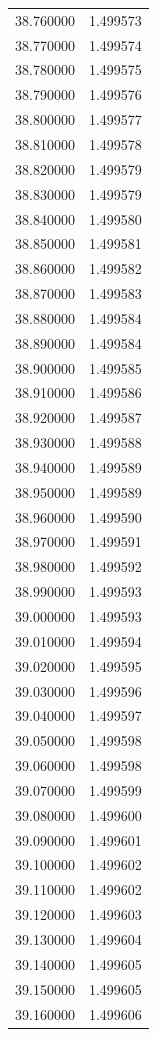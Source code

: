\begin{tabular}{rr}
38.760000 & 1.499573 \\
38.770000 & 1.499574 \\
38.780000 & 1.499575 \\
38.790000 & 1.499576 \\
38.800000 & 1.499577 \\
38.810000 & 1.499578 \\
38.820000 & 1.499579 \\
38.830000 & 1.499579 \\
38.840000 & 1.499580 \\
38.850000 & 1.499581 \\
38.860000 & 1.499582 \\
38.870000 & 1.499583 \\
38.880000 & 1.499584 \\
38.890000 & 1.499584 \\
38.900000 & 1.499585 \\
38.910000 & 1.499586 \\
38.920000 & 1.499587 \\
38.930000 & 1.499588 \\
38.940000 & 1.499589 \\
38.950000 & 1.499589 \\
38.960000 & 1.499590 \\
38.970000 & 1.499591 \\
38.980000 & 1.499592 \\
38.990000 & 1.499593 \\
39.000000 & 1.499593 \\
39.010000 & 1.499594 \\
39.020000 & 1.499595 \\
39.030000 & 1.499596 \\
39.040000 & 1.499597 \\
39.050000 & 1.499598 \\
39.060000 & 1.499598 \\
39.070000 & 1.499599 \\
39.080000 & 1.499600 \\
39.090000 & 1.499601 \\
39.100000 & 1.499602 \\
39.110000 & 1.499602 \\
39.120000 & 1.499603 \\
39.130000 & 1.499604 \\
39.140000 & 1.499605 \\
39.150000 & 1.499605 \\
39.160000 & 1.499606 \\

\end{tabular}
